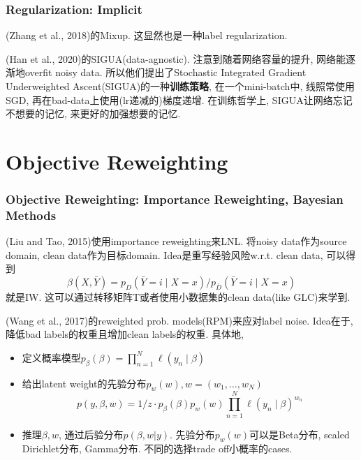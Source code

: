 \documentclass{beamer}
\newcommand{\bt}[1]{\textbf{#1}}
\begin{document}
\begin{frame}
    \frametitle{Regularization: Implicit}

    (Zhang et al., 2018)的Mixup. 这显然也是一种label regularization.

    (Han et al., 2020)的SIGUA(data-agnostic). 注意到随着网络容量的提升, 网络能逐渐地overfit noisy data. 所以他们提出了Stochastic Integrated Gradient Underweighted Ascent(SIGUA)的一种\bt{训练策略}, 在一个mini-batch中, 线照常使用SGD, 再在bad-data上使用(lr递减的)梯度递增. 在训练哲学上, SIGUA让网络忘记不想要的记忆, 来更好的加强想要的记忆.

\end{frame}

\section{Objective Reweighting}

\begin{frame}
    \frametitle{Objective Reweighting: Importance Reweighting, Bayesian Methods}

    (Liu and Tao, 2015)使用importance reweighting来LNL. 将noisy data作为source domain, clean data作为目标domain. Idea是重写经验风险w.r.t. clean data, 可以得到
    \begin{equation}
        \beta(X,\bar Y)=p_{D}(\bar{Y}=i \mid X=x) / p_{\bar{D}}(\bar{Y}=i \mid X=x)
    \end{equation}
    就是IW. 这可以通过转移矩阵T或者使用小数据集的clean data(like GLC)来学到.

    (Wang et al., 2017)的reweighted prob. models(RPM)来应对label noise. Idea在于, 降低bad labels的权重且增加clean labels的权重. 具体地,
    \begin{itemize}
        \item 定义概率模型$p_{\beta}(\beta)=\prod_{n=1}^{N} \ell\left(y_{n} \mid \beta\right)$
        \item 给出latent weight的先验分布$p_w(w), w=(w_1,\dots, w_N)$
        \begin{equation}
            p(y, \beta, w)=1 / z \cdot p_{\beta}(\beta) p_{w}(w) \prod_{n=1}^{N} \ell\left(y_{n} \mid \beta\right)^{w_{n}}
        \end{equation}
        \item 推理$\beta, w$, 通过后验分布$p(\beta, w| y)$. 先验分布$p_w(w)$可以是Beta分布, scaled Dirichlet分布, Gamma分布. 不同的选择trade off小概率的cases.
    \end{itemize}

\end{frame}
\end{document}
